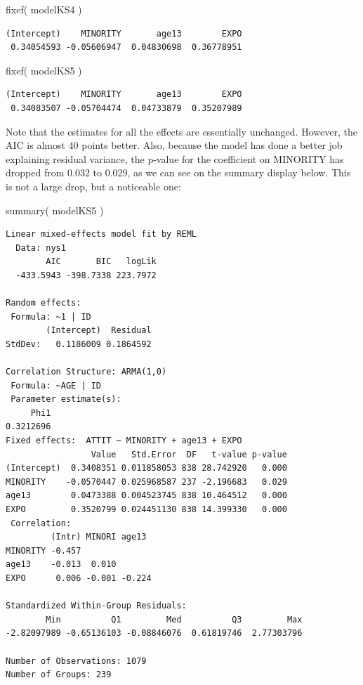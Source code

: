 \documentclass[
  letterpaper,
  DIV=11,
  numbers=noendperiod]{scrreprt}
\newenvironment{Shaded}{\begin{snugshade}}{\end{snugshade}}
\newcommand{\FunctionTok}[1]{\textcolor[rgb]{0.02,0.16,0.49}{#1}}
\newcommand{\NormalTok}[1]{\textcolor[rgb]{0.00,0.44,0.13}{#1}}
\begin{document}
\begin{Shaded}
\begin{Highlighting}[]
\FunctionTok{fixef}\NormalTok{( modelKS4 )}
\end{Highlighting}
\end{Shaded}

\begin{verbatim}
(Intercept)    MINORITY       age13        EXPO 
 0.34054593 -0.05606947  0.04830698  0.36778951 
\end{verbatim}

\begin{Shaded}
\begin{Highlighting}[]
\FunctionTok{fixef}\NormalTok{( modelKS5 )}
\end{Highlighting}
\end{Shaded}

\begin{verbatim}
(Intercept)    MINORITY       age13        EXPO 
 0.34083507 -0.05704474  0.04733879  0.35207989 
\end{verbatim}

Note that the estimates for all the effects are essentially unchanged.
However, the AIC is almost 40 points better. Also, because the model has
done a better job explaining residual variance, the p-value for the
coefficient on MINORITY has dropped from 0.032 to 0.029, as we can see
on the summary display below. This is not a large drop, but a noticeable
one:

\begin{Shaded}
\begin{Highlighting}[]
\FunctionTok{summary}\NormalTok{( modelKS5 )}
\end{Highlighting}
\end{Shaded}

\begin{verbatim}
Linear mixed-effects model fit by REML
  Data: nys1 
        AIC       BIC   logLik
  -433.5943 -398.7338 223.7972

Random effects:
 Formula: ~1 | ID
        (Intercept)  Residual
StdDev:   0.1186009 0.1864592

Correlation Structure: ARMA(1,0)
 Formula: ~AGE | ID 
 Parameter estimate(s):
     Phi1 
0.3212696 
Fixed effects:  ATTIT ~ MINORITY + age13 + EXPO 
                 Value   Std.Error  DF   t-value p-value
(Intercept)  0.3408351 0.011858053 838 28.742920   0.000
MINORITY    -0.0570447 0.025968587 237 -2.196683   0.029
age13        0.0473388 0.004523745 838 10.464512   0.000
EXPO         0.3520799 0.024451130 838 14.399330   0.000
 Correlation: 
         (Intr) MINORI age13 
MINORITY -0.457              
age13    -0.013  0.010       
EXPO      0.006 -0.001 -0.224

Standardized Within-Group Residuals:
        Min          Q1         Med          Q3         Max 
-2.82097989 -0.65136103 -0.08846076  0.61819746  2.77303796 

Number of Observations: 1079
Number of Groups: 239 
\end{verbatim}
\end{document}
